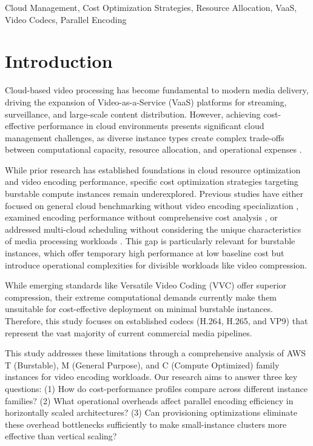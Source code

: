 \documentclass[conference]{IEEEtran}
\begin{document}
	\begin{IEEEkeywords}
		Cloud Management, Cost Optimization Strategies, Resource Allocation, VaaS, Video Codecs, Parallel Encoding
	\end{IEEEkeywords}
	
	\section{Introduction}
	
	Cloud-based video processing has become fundamental to modern media delivery, driving the expansion of Video-as-a-Service (VaaS) platforms for streaming, surveillance, and large-scale content distribution. However, achieving cost-effective performance in cloud environments presents significant cloud management challenges, as diverse instance types create complex trade-offs between computational capacity, resource allocation, and operational expenses \cite{b1,b17}.
	
	While prior research has established foundations in cloud resource optimization and video encoding performance, specific cost optimization strategies targeting burstable compute instances remain underexplored. Previous studies have either focused on general cloud benchmarking without video encoding specialization \cite{b1}, examined encoding performance without comprehensive cost analysis \cite{b3}, or addressed multi-cloud scheduling without considering the unique characteristics of media processing workloads \cite{b20}. This gap is particularly relevant for burstable instances, which offer temporary high performance at low baseline cost but introduce operational complexities for divisible workloads like video compression.
	
	While emerging standards like Versatile Video Coding (VVC) offer superior compression, their extreme computational demands currently make them unsuitable for cost-effective deployment on minimal burstable instances. Therefore, this study focuses on established codecs (H.264, H.265, and VP9) that represent the vast majority of current commercial media pipelines.
	
	This study addresses these limitations through a comprehensive analysis of AWS T (Burstable), M (General Purpose), and C (Compute Optimized) family instances for video encoding workloads. Our research aims to answer three key questions: (1) How do cost-performance profiles compare across different instance families? (2) What operational overheads affect parallel encoding efficiency in horizontally scaled architectures? (3) Can provisioning optimizations eliminate these overhead bottlenecks sufficiently to make small-instance clusters more effective than vertical scaling?
	
\end{document}
